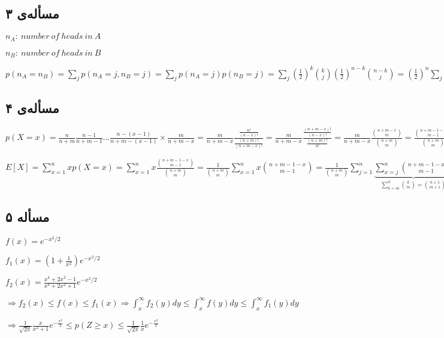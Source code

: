 \documentclass[12pt]{article}
\begin{document}
\subsection*{مسأله‌ی ۳}
\begin{flushleft}
$n_A: \ number\ of \ heads\ in \ A$

$n_B: \ number\ of \ heads\ in \ B$

$p(n_A=n_B)=\sum_j p(n_A=j,n_B=j)=\sum_j p(n_A=j)p(n_B=j)=\sum_j (\frac{1}{2})^k \binom{k}{j} (\frac{1}{2})^{n-k} \binom{n-k}{j}=(\frac{1}{2})^n \sum_j \binom{k}{j}\binom{n-k}{j}=(\frac{1}{2})^n\binom{n}{k}=p(n_A+n_B=k)$
\end{flushleft}
\subsection*{مسأله‌ی ۴}
\begin{flushleft}
$p(X=x)=
\frac{n}{n+m}\frac{n-1}{n+m-1}...\frac{n-(x-1)}{n+m-(x-1)}\times\frac{m}{n+m-x}=
\frac{m}{n+m-x}\frac{\frac{n!}{(n-x)!}}{\frac{(n+m)!}{(n+m-x)!}}=
\frac{m}{n+m-x}\frac{\frac{(n+m-x)!}{(n-x)!}}{\frac{(n+m)!}{n!}}=
\frac{m}{n+m-x}\frac{\binom{n+m-x}{m}}{\binom{n+m}{m}}=
\frac{\binom{n+m-1-x}{m-1}}{\binom{n+m}{m}}$

$E[X]=\sum_{x=1}^{n} xp(X=x)=
\sum_{x=1}^{n} x \frac{\binom{n+m-1-x}{m-1}}{\binom{n+m}{m}}=
\frac{1}{\binom{n+m}{m}}\sum_{x=1}^{n} x \binom{n+m-1-x}{m-1}=
\frac{1}{\binom{n+m}{m}}\sum_{j=1}^{n} \underbrace{\sum_{x=j}^{n} \binom{n+m-1-x}{m-1}}_{\sum_{k=m}^n \binom{k}{m}=\binom{n+1}{m+1}}=
\frac{1}{\binom{n+m}{m}}\sum_{j=1}^{n} \binom{m-1+n-j+1}{m-1+1}=
\frac{1}{\binom{n+m}{m}} \underbrace{\sum_{j=1}^{n} \binom{m+n-j}{m}}_{\sum_{k=m}^n \binom{k}{m}=\binom{n+1}{m+1}}=
\frac{1}{\binom{n+m}{m}} \binom{n+m}{m+1}=\frac{\frac{(n+m)!}{(m+1)!(n-1)!}}{\frac{(n+m)!}{n!m!}}=
\boxed{\frac{n}{m+1}}$

\end{flushleft}
\subsection*{مسأله‌ ۵}
\begin{flushleft}
$f(x)=e^{-x^2/2}$

$f_1(x)=(1+\frac{1}{x^2})e^{-x^2/2}$

$f_2(x)=\frac{x^4+2x^2-1}{x^4+2x^2+1}e^{-x^2/2}$

$\Rightarrow f_2(x)\leq f(x) \leq f_1(x) \Rightarrow \int_x^{\infty}f_2(y)dy\leq\int_x^{\infty}f(y)dy\leq\int_x^{\infty}f_1(y)dy$

$\Rightarrow \frac{1}{\sqrt{2\pi}}\frac{x}{x^2+1}e^{-\frac{x^2}{2}}\leq p(Z\geq x)\leq \frac{1}{\sqrt{2\pi}}\frac{1}{x}e^{-\frac{x^2}{2}}$
\end{flushleft}
\end{document}

